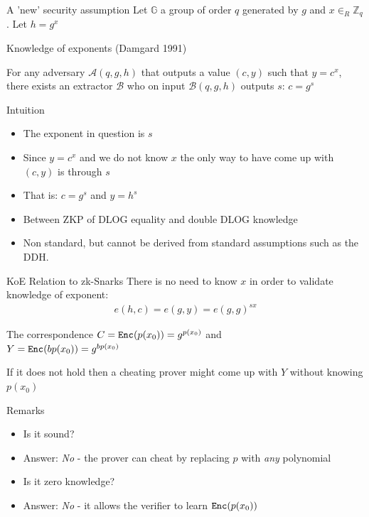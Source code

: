 \documentclass[handout]{beamer}
\begin{document}
\begin{frame}[allowframebreaks]{A 'new' security assumption}
    Let $\mathbb{G}$ a group of order $q$ generated by $g$ and $x \in_R \mathbb{Z}_q$. Let $h = g^x$
    \begin{block}{Knowledge of exponents (Damgard 1991)} 
    
    For any adversary $\mathcal{A}(q,g,h)$ that outputs a value $(c,y)$ such that $y=c^x$,
    there exists an extractor $\mathcal{B}$ who on input $\mathcal{B}(q,g,h)$ 
    outputs $s$: $c=g^s$
    \end{block}
    \framebreak
    \begin{block}{Intuition}
        \begin{itemize}
            \item The exponent in question is $s$  
            \item Since $y=c^x$ and we do not know $x$ the only way to have come up with $(c,y)$ is  
                  through $s$
            \item That is: $c=g^s$ and $y=h^s$  
            \item Between ZKP of DLOG equality and double DLOG knowledge  
            \item Non standard, but cannot be derived from standard assumptions such as the DDH.  
        \end{itemize}
    \end{block}   
\end{frame}

\begin{frame}{KoE Relation to zk-Snarks}
There is no need to know $x$ in order to validate knowledge of exponent:
\begin{align*}
e(h,c) = e(g,y) = e(g,g)^{sx}
\end{align*}
\pause
\begin{block}{The correspondence}
$C=\mathtt{Enc}(p(x_0))=g^{p(x_0)}$ and \\
$Y=\mathtt{Enc}(bp(x_0))=g^{bp(x_0)}$
\end{block}
If it does not hold then a cheating prover might come up with $Y$ without knowing $p(x_0)$
\end{frame}

\begin{frame}{Remarks}
    \begin{itemize}
        \item Is it sound?
        \pause
        \item Answer: \emph{No} - the prover can cheat by replacing $p$ with \emph{any} polynomial
        \pause
        \item Is it zero knowledge?
        \pause
        \item Answer: \emph{No} - it allows the verifier to learn $\mathtt{Enc}(p(x_0))$
    \end{itemize}
\end{frame}
\end{document}
